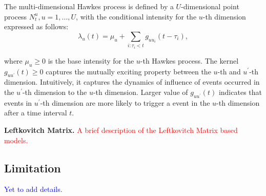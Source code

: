 The multi-dimensional Hawkes process is defined by a $U$-dimensional point process $N_t^u, u =1, . . . , U$, with the conditional intensity for the $u$-th dimension expressed as follows:
$$\lambda_u(t) = \mu_u + \sum_{i:\tau_i<t} g_{uu_i}(t-\tau_i),$$

where $\mu_u \ge 0$ is the base intensity for the $u$-th Hawkes process. The kernel $g_{uu^\prime}(t) \ge 0$ captures the mutually exciting property between the $u$-th and $u^\prime$-th dimension. Intuitively, it captures the dynamics of influence of events occurred in the $u^\prime$-th dimension to the $u$-th dimension. Larger value of $g_{uu^\prime}(t)$  indicates that events in $u^\prime$-th dimension are more likely to trigger a event in the $u$-th dimension after a time interval $t$.

\textbf{Leftkovitch Matrix.} \textcolor{red}{A brief description of the Leftkovitch Matrix based models.}

\subsection{Limitation}
\textcolor{blue}{Yet to add details.}

